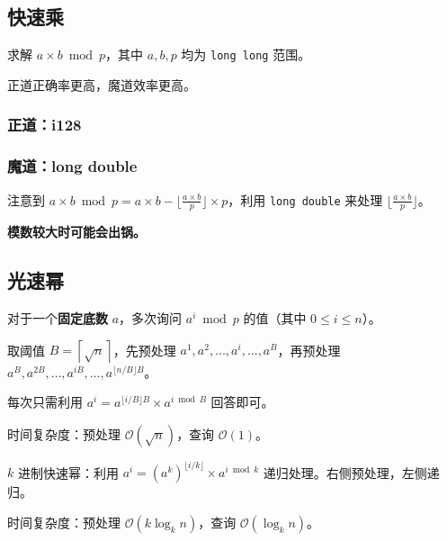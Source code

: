 \subsection{快速乘}

求解 $a \times b \bmod p$，其中 $a, b, p$ 均为 \texttt{long long} 范围。

正道正确率更高，魔道效率更高。

\subsubsection{正道：i128}


\subsubsection{魔道：long double}

注意到 $a\times b \bmod p = a\times b - \lfloor \frac{a \times b}{p} \rfloor\times p$，利用 \texttt{long double} 来处理 $\lfloor \frac{a \times b}{p} \rfloor$。

\textbf{模数较大时可能会出锅。}


\subsection{光速幂}

对于一个\textbf{固定底数} $a$，多次询问 $a^i \bmod p$ 的值（其中 $0 \leq i \leq n$）。

取阈值 $B = \left\lceil \sqrt{n} \right\rceil$，先预处理 $a^1, a^2, \dots, a^i, \dots, a^B$，再预处理 $a^B, a^{2B}, \dots, a^{iB}, \dots, a^{\lfloor n / B \rfloor B}$。

每次只需利用 $a^i = a^{\lfloor i / B \rfloor B}\times a^{i \bmod B}$ 回答即可。

时间复杂度：预处理 $\mathcal{O}(\sqrt{n})$，查询 $\mathcal{O}(1)$。

\begin{quoteblock}
$k$ 进制快速幂：利用 $a^i = \left( a^k \right)^{\lfloor i / k \rfloor} \times a^{i \bmod k}$ 递归处理。右侧预处理，左侧递归。

时间复杂度：预处理 $\mathcal{O}(k \log_k n)$，查询 $\mathcal{O}(\log_k n)$。
\end{quoteblock}


